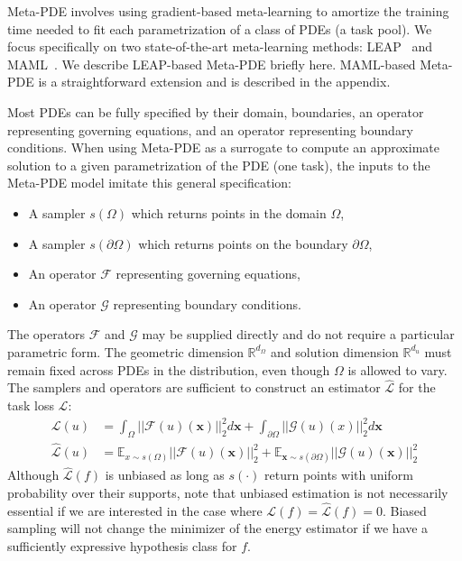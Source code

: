 Meta-PDE involves using gradient-based meta-learning to amortize the training time needed to fit each parametrization of a class of PDEs (a task pool). We focus specifically on two state-of-the-art meta-learning methods: LEAP~\citep{flennerhag2018transferring} and MAML~\citep{finn2017model}. We describe LEAP-based Meta-PDE briefly here. MAML-based Meta-PDE is a straightforward extension and is described in the appendix.

Most PDEs can be fully specified by their domain, boundaries, an operator representing governing equations, and an operator representing boundary conditions. When using Meta-PDE as a surrogate to compute an approximate solution to a given parametrization of the PDE (one task), the inputs to the Meta-PDE model imitate this general specification:
\begin{itemize}
  \item A sampler $s(\Omega)$ which returns points in the domain $\Omega$,
  \item A sampler $s(\partial\Omega)$ which returns points on the boundary $\partial\Omega$,
  \item An operator $\mathcal{F}$ representing governing equations,
  \item An operator $\mathcal{G}$ representing boundary conditions.
\end{itemize}
The operators $\mathcal{F}$ and $\mathcal{G}$ may be supplied directly and do not require a particular parametric form. The geometric dimension $\mathbb{R}^{d_\Omega}$ and solution dimension $\mathbb{R}^{d_u}$ must remain fixed across PDEs in the distribution, even though $\Omega$ is allowed to vary. The samplers and operators are sufficient to construct an estimator $\hat{\mathcal{L}}$ for the task loss $\mathcal{L}$:
\begin{align}
  \mathcal{L}(u) &= \int_{\Omega} \big|\big|\mathcal{F}(u)(\bm{x})\big|\big|^2_2 d\bm{x} +
  \int_{\partial\Omega} \big|\big|\mathcal{G}(u)(x)\big|\big|_2^2 d\bm{x} \\
  \hat{\mathcal{L}}(u) &= \mathbb{E}_{x \sim s(\Omega)} \big|\big|\mathcal{F}(u)(\bm{x})\big|\big|^2_2 +
  \mathbb{E}_{\bm{x} \sim s(\partial \Omega)} \big|\big|\mathcal{G}(u)(\bm{x})\big|\big|_2^2
\end{align}
Although $\hat{\mathcal{L}}(f)$ is unbiased as long as $s(\cdot)$ return points with uniform probability over their supports, note that unbiased estimation is not necessarily essential if we are interested in the case where $\mathcal{L}(f) = \hat{\mathcal{L}}(f) = 0$. Biased sampling will not change the minimizer of the energy estimator if we have a sufficiently expressive hypothesis class for $f$.

